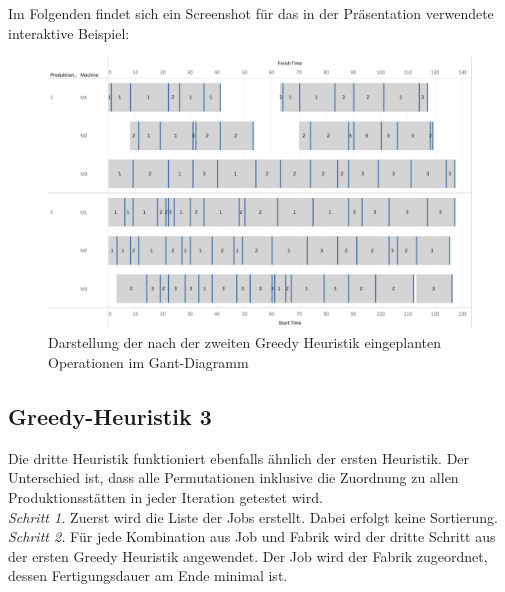\documentclass[final, english, ngerman, a4paper, 12pt, %
numbers=noenddot,
cd=true,
cdfont=false,cdfont=nohead,cdfont=nodin,
cdmath=false,
cdhead=false,
cdfoot=true,
cdcover=monochrome,
cdgeometry=symmetric,
declaration=heading,
declaration=notoc,
abstract=heading,
]{tudscrreprt}
\begin{document}
\noindent
Im Folgenden findet sich ein Screenshot für das in der Präsentation verwendete interaktive Beispiel:
\begin{figure}[H]
	\centering
	\includegraphics[width=\textwidth]{./settings/gh2}
	\caption[Interaktives Beispiel - Einplanung nach der zweiten Greedy Heuristik]{Darstellung der nach der zweiten Greedy Heuristik eingeplanten Operationen im Gant-Diagramm\footnotemark}\label{fig:gh2}
\end{figure}

\subsection{Greedy-Heuristik 3}
Die dritte Heuristik funktioniert ebenfalls ähnlich der ersten Heuristik. Der Unterschied ist, dass alle Permutationen inklusive die Zuordnung zu allen Produktionsstätten in jeder Iteration getestet wird.\\

\noindent
\textit{Schritt 1.}  Zuerst wird die Liste der Jobs erstellt. Dabei erfolgt keine Sortierung.\\

\noindent
\textit{Schritt 2.} Für jede Kombination aus Job und Fabrik wird der dritte Schritt aus der ersten Greedy Heuristik angewendet. Der Job wird der Fabrik zugeordnet, dessen Fertigungsdauer am Ende minimal ist. \\
\end{document}
